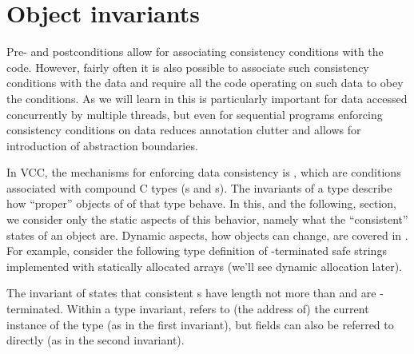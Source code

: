 \section{Object invariants}
\label{sect:invariants}


Pre- and postconditions allow for associating consistency conditions
with the code.
However, fairly often it is also possible to associate such consistency
conditions with the data and require all the code operating on such data
to obey the conditions.
As we will learn in  this is particularly important for
data accessed concurrently by multiple threads,
but even for sequential programs enforcing consistency conditions
on data reduces annotation clutter and allows for introduction of abstraction
boundaries.


In VCC, the mechanisms for enforcing data consistency is , which are conditions associated
with compound C types (s and s).
The invariants of a type describe how ``proper'' objects of of that type
behave. 
In this, and the following, section, we consider only the static aspects of this
behavior, namely what the ``consistent'' states of an object are. 
Dynamic aspects, \ie how objects can change, are covered in .
For example, consider the following type definition of -terminated
safe strings implemented with statically allocated arrays (we'll see
dynamic allocation later).


\noindent
The invariant of  states that consistent
s have length not more than  and are
-terminated.  Within a type invariant, \vcc{\this} refers to
(the address of) the current instance of the type (as in the first
invariant), but fields can also be referred to directly (as in the
second invariant). 


